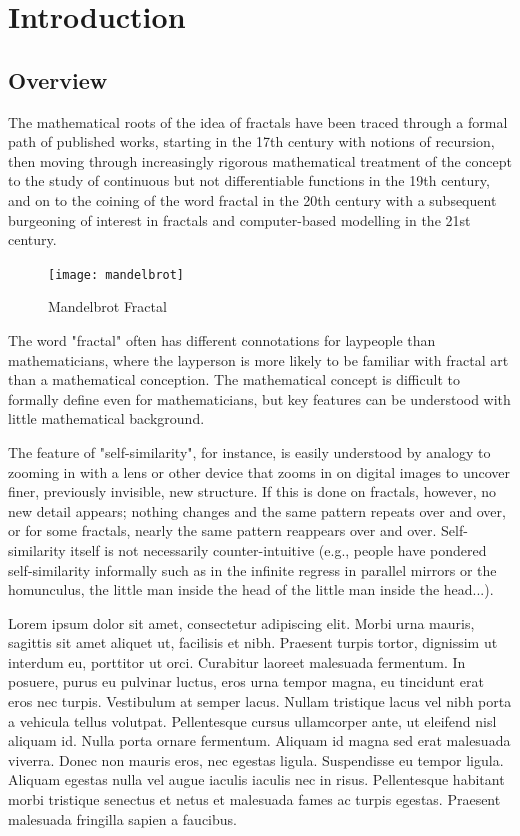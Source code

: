 \documentclass{fisatproject}
\begin{document}
\cleardoublepage
{}
\listoftables
\newpage



\chapter{Introduction}
\setcounter{page}{1}
\renewcommand{\baselinestretch}{1.50}
\section{Overview}
The mathematical roots of the idea of fractals have been traced through a formal path of published works, starting in the 17th century with notions of recursion, then moving through increasingly rigorous mathematical treatment of the concept to the study of continuous but not differentiable functions in the 19th century, and on to the coining of the word fractal in the 20th century with a subsequent burgeoning of interest in fractals and computer-based modelling in the 21st century.
\begin{figure}[h!]
\begin{center}
\texttt{[image: mandelbrot]}
\caption{Mandelbrot Fractal}
\end{center}
\end{figure}
The word "fractal" often has different connotations for laypeople than mathematicians, where the layperson is more likely to be familiar with fractal art than a mathematical conception. The mathematical concept is difficult to formally define even for mathematicians, but key features can be understood with little mathematical background.

The feature of "self-similarity", for instance, is easily understood by analogy to zooming in with a lens or other device that zooms in on digital images to uncover finer, previously invisible, new structure. If this is done on fractals, however, no new detail appears; nothing changes and the same pattern repeats over and over, or for some fractals, nearly the same pattern reappears over and over. Self-similarity itself is not necessarily counter-intuitive (e.g., people have pondered self-similarity informally such as in the infinite regress in parallel mirrors or the homunculus, the little man inside the head of the little man inside the head...). 

Lorem ipsum dolor sit amet, consectetur adipiscing elit. Morbi urna mauris, sagittis sit amet aliquet ut, facilisis et nibh. Praesent turpis tortor, dignissim ut interdum eu, porttitor ut orci. Curabitur laoreet malesuada fermentum. In posuere, purus eu pulvinar luctus, eros urna tempor magna, eu tincidunt erat eros nec turpis. Vestibulum at semper lacus. Nullam tristique lacus vel nibh porta a vehicula tellus volutpat. Pellentesque cursus ullamcorper ante, ut eleifend nisl aliquam id. Nulla porta ornare fermentum. Aliquam id magna sed erat malesuada viverra. Donec non mauris eros, nec egestas ligula. Suspendisse eu tempor ligula. Aliquam egestas nulla vel augue iaculis iaculis nec in risus. Pellentesque habitant morbi tristique senectus et netus et malesuada fames ac turpis egestas. Praesent malesuada fringilla sapien a faucibus.
\end{document}
